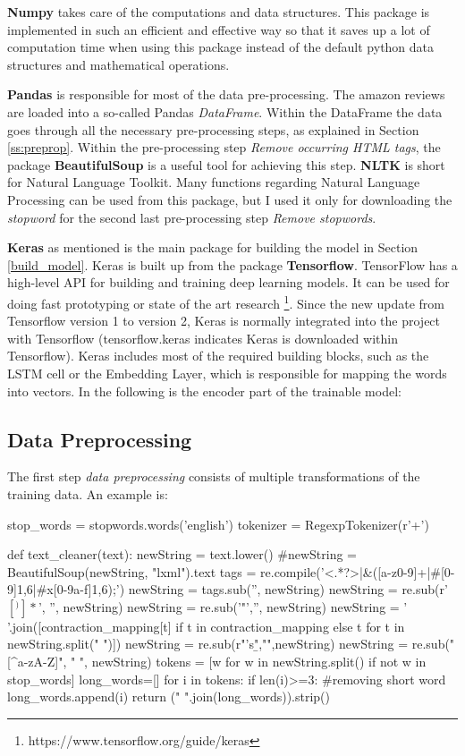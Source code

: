\textbf{Numpy} takes care of the computations and data structures. This package is implemented in such an efficient and effective way so that it saves up a lot of computation time when using this package instead of the default python data structures and mathematical operations.

\textbf{Pandas} is responsible for most of the data pre-processing. The amazon reviews are loaded into a so-called Pandas \textit{DataFrame}. Within the DataFrame the data goes through all the necessary pre-processing steps, as explained in Section \ref{ss:preprop}. Within the pre-processing step \textit{Remove occurring HTML tags}, the package \textbf{BeautifulSoup} is a useful tool for achieving this step. \textbf{NLTK} is short for Natural Language Toolkit. Many functions regarding Natural Language Processing can be used from this package, but I used it only for downloading the \textit{stopword} for the second last pre-processing step \textit{Remove stopwords}.

\textbf{Keras} as mentioned is the main package for building the model in Section \ref{build_model}. Keras is built up from the package \textbf{Tensorflow}. TensorFlow has a high-level API for building and training deep learning models. It can be used for doing fast prototyping or state of the art research \footnote{https://www.tensorflow.org/guide/keras}. Since the new update from Tensorflow version 1 to version 2, Keras is normally integrated into the project with Tensorflow (tensorflow.keras indicates Keras is downloaded within Tensorflow). Keras includes most of the required building blocks, such as the LSTM cell or the Embedding Layer, which is responsible for mapping the words into vectors. In the following is the encoder part of the trainable model: \\ 


\subsection{Data Preprocessing}
The first step \textit{data preprocessing} consists of multiple transformations of the training data. An example is:

\begin{python}
	stop_words = stopwords.words('english')
	tokenizer = RegexpTokenizer(r'\w+')
	
	def text_cleaner(text):
	newString = text.lower()
	#newString = BeautifulSoup(newString, "lxml").text
	tags = re.compile('<.*?>|&([a-z0-9]+|#[0-9]{1,6}|#x[0-9a-f]{1,6});')
	newString = tags.sub('', newString)
	newString = re.sub(r'\([^)]*\)', '', newString)
	newString = re.sub('"','', newString)
	newString = ' '.join([contraction_mapping[t] if t in contraction_mapping else t for t in newString.split(" ")])    
	newString = re.sub(r"'s\b","",newString)
	newString = re.sub("[^a-zA-Z]", " ", newString) 
	tokens = [w for w in newString.split() if not w in stop_words]
	long_words=[]
	for i in tokens:
	if len(i)>=3:                  #removing short word
	long_words.append(i)   
	return (" ".join(long_words)).strip()
\end{python}

